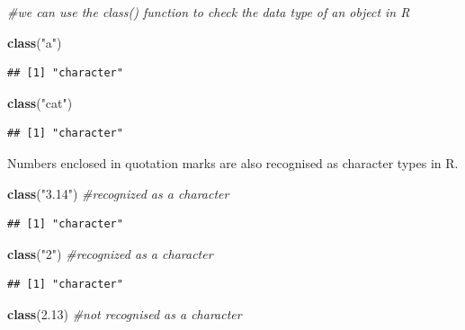 \documentclass[
]{book}
\newenvironment{Shaded}{\begin{snugshade}}{\end{snugshade}}
\newcommand{\CommentTok}[1]{\textcolor[rgb]{0.56,0.35,0.01}{\textit{#1}}}
\newcommand{\FloatTok}[1]{\textcolor[rgb]{0.00,0.00,0.81}{#1}}
\newcommand{\FunctionTok}[1]{\textcolor[rgb]{0.13,0.29,0.53}{\textbf{#1}}}
\newcommand{\NormalTok}[1]{#1}
\newcommand{\StringTok}[1]{\textcolor[rgb]{0.31,0.60,0.02}{#1}}
\begin{document}
\begin{Shaded}
\begin{Highlighting}[]
\CommentTok{\#we can use the class() function to check the data type of an object in R}

\FunctionTok{class}\NormalTok{(}\StringTok{"a"}\NormalTok{)}
\end{Highlighting}
\end{Shaded}

\begin{verbatim}
## [1] "character"
\end{verbatim}

\begin{Shaded}
\begin{Highlighting}[]
\FunctionTok{class}\NormalTok{(}\StringTok{"cat"}\NormalTok{)}
\end{Highlighting}
\end{Shaded}

\begin{verbatim}
## [1] "character"
\end{verbatim}

Numbers enclosed in quotation marks are also recognised as character types in R.

\begin{Shaded}
\begin{Highlighting}[]
\FunctionTok{class}\NormalTok{(}\StringTok{"3.14"}\NormalTok{) }\CommentTok{\#recognized as a character}
\end{Highlighting}
\end{Shaded}

\begin{verbatim}
## [1] "character"
\end{verbatim}

\begin{Shaded}
\begin{Highlighting}[]
\FunctionTok{class}\NormalTok{(}\StringTok{"2"}\NormalTok{) }\CommentTok{\#recognized as a character}
\end{Highlighting}
\end{Shaded}

\begin{verbatim}
## [1] "character"
\end{verbatim}

\begin{Shaded}
\begin{Highlighting}[]
\FunctionTok{class}\NormalTok{(}\FloatTok{2.13}\NormalTok{) }\CommentTok{\#not recognised as a character}
\end{Highlighting}
\end{Shaded}
\end{document}
